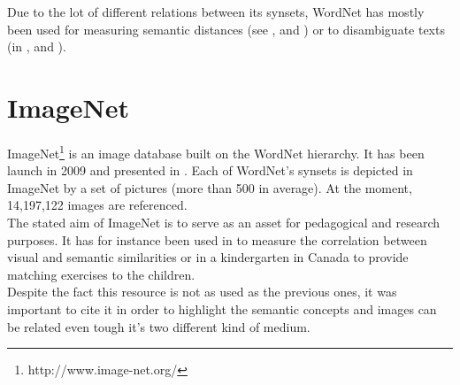 Due to the lot of different relations between its synsets, WordNet has mostly been used for measuring semantic distances (see \cite{budanitsky2001semantic}, \cite{richardson1994using} and \cite{agirre2009study}) or to disambiguate texts (in \cite{resnik1995disambiguating}, \cite{voorhees1993using} and \cite{banerjee2002adapted}).\\

\section{ImageNet} %
\label{sec:imagenet}

ImageNet\footnote{http://www.image-net.org/} is an image database built on the WordNet hierarchy. It has been launch in 2009 and presented in \cite{deng2009imagenet}. Each of WordNet's synsets is depicted in ImageNet by a set of pictures (more than 500 in average). At the moment, 14,197,122 images are referenced.\\

The stated aim of ImageNet is to serve as an asset for pedagogical and research purposes. It has for instance been used in \cite{deselaers2011visual} to measure the correlation between visual and semantic similarities or in a kindergarten in Canada to provide matching exercises to the children.\\

Despite the fact this resource is not as used as the previous ones, it was important to cite it in order to highlight the semantic concepts and images can be related even tough it's two different kind of medium.  
